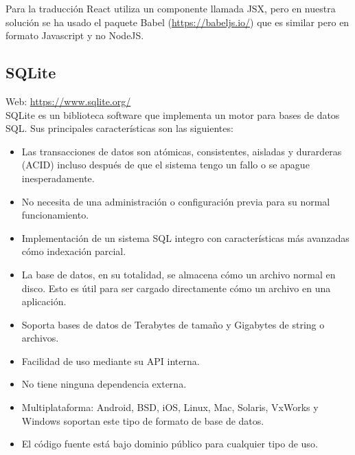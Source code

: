 Para la traducción React utiliza un componente llamada JSX, pero en nuestra solución se ha usado el paquete Babel (\url{https://babeljs.io/}) que es similar pero en formato Javascript y no NodeJS.\\

\subsection{SQLite}


Web: \url{https://www.sqlite.org/}\\

SQLite es un biblioteca software que implementa un motor para bases de datos SQL. Sus principales características son las siguientes:

\begin{itemize}
\item Las transacciones de datos son atómicas, consistentes, aisladas y durarderas (ACID) incluso después de que el sistema tengo un fallo o se apague inesperadamente.
\item No necesita de una administración o configuración previa para su normal funcionamiento.
\item Implementación de un sistema SQL integro con características más avanzadas cómo indexación parcial.
\item La base de datos, en su totalidad, se almacena cómo un archivo normal en disco. Esto es útil para ser cargado directamente cómo un archivo en una aplicación.
\item Soporta bases de datos de Terabytes de tamaño y Gigabytes de string o archivos.
\item Facilidad de uso mediante su API interna.
\item No tiene ninguna dependencia externa.
\item Multiplataforma: Android, BSD, iOS, Linux, Mac, Solaris, VxWorks y Windows soportan este tipo de formato de base de datos.
\item El código fuente está bajo dominio público para cualquier tipo de uso.
\end{itemize}

